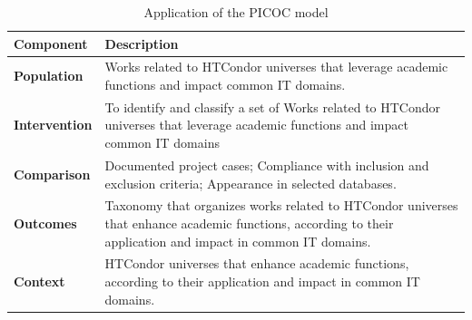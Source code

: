 \begin{table}[htbp]
	\centering
	\caption{Application of the PICOC model}
	\label{table:PICOC}
	\renewcommand{\arraystretch}{1}  %
	\begin{tabular}{p{1.4cm}p{6.4cm}}
		\toprule
		\textbf{Component}    & \textbf{Description}                                                                                                                                         \\
		\midrule
		\textbf{Population}   & Works related to HTCondor universes that leverage academic functions and impact common IT domains.                                                           \\
		\addlinespace[0.8em]
		\textbf{Intervention} & To identify and classify a set of Works related to HTCondor universes that leverage academic functions and impact common IT domains                          \\
		\addlinespace[0.8em]
		\textbf{Comparison}   & Documented project cases; Compliance with inclusion and exclusion criteria; Appearance in selected databases.                                                \\
		\addlinespace[0.8em]
		\textbf{Outcomes}     & Taxonomy that organizes works related to HTCondor universes that enhance academic functions, according to their application and impact in common IT domains. \\
		\addlinespace[0.8em]
		\textbf{Context}      & HTCondor universes that enhance academic functions, according to their application and impact in common IT domains.                                          \\
		\bottomrule
	\end{tabular}
\end{table}

